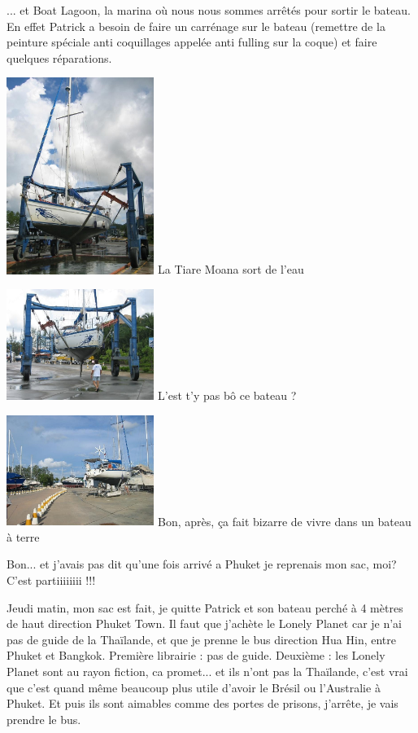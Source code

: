 \begin{multicols}{2}
... et Boat Lagoon, la marina où nous nous sommes arrêtés pour sortir le bateau. En effet Patrick a besoin de faire un carrénage sur le bateau (remettre de la peinture spéciale anti coquillages appelée anti fulling sur la coque) et faire quelques réparations.

\hspace*{-0.65cm}
\includegraphics[width=4.8cm]{articles/Phucket/1212162371CgQw.jpg}
La Tiare Moana sort de l'eau

\hspace*{-0.65cm}
\includegraphics[width=4.8cm]{articles/Phucket/1212162371bVDs.jpg}
L'est t'y pas bô ce bateau ?

\hspace*{-0.65cm}
\includegraphics[width=4.8cm]{articles/Phucket/1212162369pBl0.jpg}
Bon, après, ça fait bizarre de vivre dans un bateau à terre

Bon... et j'avais pas dit qu'une fois arrivé a Phuket je reprenais mon sac, moi? C'est partiiiiiiii !!!

Jeudi matin, mon sac est fait, je quitte Patrick et son bateau perché à 4 mètres de haut direction Phuket Town. Il faut que j'achète le Lonely Planet car je n'ai pas de guide de la Thaïlande, et que je prenne le bus direction Hua Hin, entre Phuket et Bangkok. Première librairie : pas de guide. Deuxième : les Lonely Planet sont au rayon fiction, ca promet... et ils n'ont pas la Thaïlande, c'est vrai que c'est quand même beaucoup plus utile d'avoir le Brésil ou l'Australie à Phuket. Et puis ils sont aimables comme des portes de prisons, j'arrête, je vais prendre le bus.


\end{multicols}
